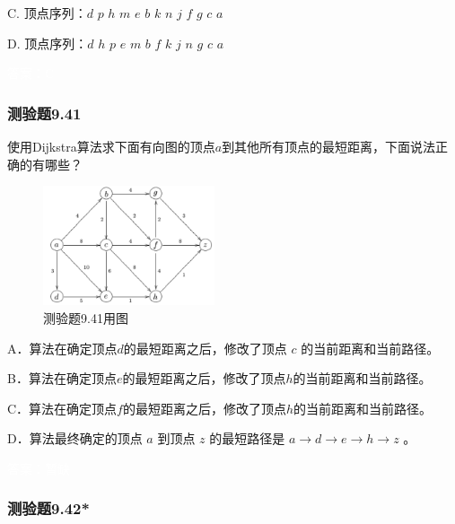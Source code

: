 \documentclass[UTF8, heading=true]{ctexart}
\begin{document}
C. 顶点序列：$d$ \quad $p$ \quad $h$ \quad $m$ \quad $e$ \quad $b$ \quad $k$ \quad $n$ \quad $j$ \quad $f$ \quad $g$ \quad $c$ \quad $a$

D. 顶点序列：$d$ \quad $h$ \quad $p$ \quad $e$ \quad $m$ \quad $b$ \quad $f$ \quad $k$ \quad $j$ \quad $n$ \quad $g$ \quad $c$ \quad $a$



\textcolor{white}{答案：C}

\subsubsection{测验题9.41}

使用Dijkstra算法求下面有向图的顶点$a$到其他所有顶点的最短距离，下面说法正确的有哪些？

\begin{figure}[H]
  \centering
  \includegraphics[width=0.45\textwidth]{9.43.jpg} %
  \caption{测验题9.41用图}
\end{figure}

A．算法在确定顶点$d$的最短距离之后，修改了顶点 $c$ 的当前距离和当前路径。

B．算法在确定顶点$e$的最短距离之后，修改了顶点$h$的当前距离和当前路径。

C．算法在确定顶点$f$的最短距离之后，修改了顶点$h$的当前距离和当前路径。

D．算法最终确定的顶点 $a$ 到顶点 $z$ 的最短路径是 $a \rightarrow d \rightarrow e \rightarrow h \rightarrow z$ 。


\textcolor{white}{答案：暂缺}

\subsubsection{测验题9.42*}
\end{document}
